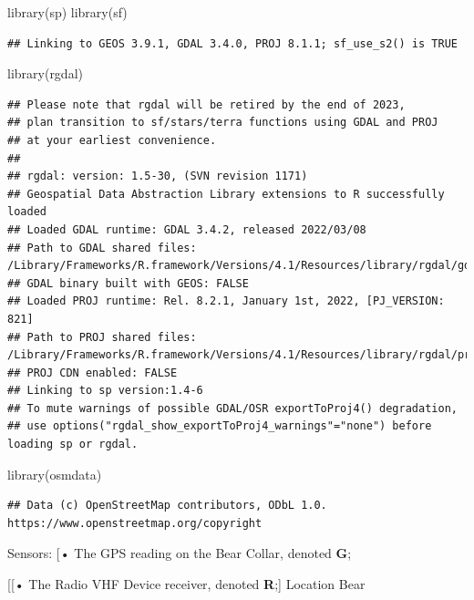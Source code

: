 \documentclass[
]{article}
\newenvironment{Shaded}{\begin{snugshade}}{\end{snugshade}}
\newcommand{\FunctionTok}[1]{\textcolor[rgb]{0.00,0.00,0.00}{#1}}
\newcommand{\NormalTok}[1]{#1}
\begin{document}
\begin{Shaded}
\begin{Highlighting}[]
\FunctionTok{library}\NormalTok{(sp)}
\FunctionTok{library}\NormalTok{(sf)}
\end{Highlighting}
\end{Shaded}

\begin{verbatim}
## Linking to GEOS 3.9.1, GDAL 3.4.0, PROJ 8.1.1; sf_use_s2() is TRUE
\end{verbatim}

\begin{Shaded}
\begin{Highlighting}[]
\FunctionTok{library}\NormalTok{(rgdal)}
\end{Highlighting}
\end{Shaded}

\begin{verbatim}
## Please note that rgdal will be retired by the end of 2023,
## plan transition to sf/stars/terra functions using GDAL and PROJ
## at your earliest convenience.
## 
## rgdal: version: 1.5-30, (SVN revision 1171)
## Geospatial Data Abstraction Library extensions to R successfully loaded
## Loaded GDAL runtime: GDAL 3.4.2, released 2022/03/08
## Path to GDAL shared files: /Library/Frameworks/R.framework/Versions/4.1/Resources/library/rgdal/gdal
## GDAL binary built with GEOS: FALSE 
## Loaded PROJ runtime: Rel. 8.2.1, January 1st, 2022, [PJ_VERSION: 821]
## Path to PROJ shared files: /Library/Frameworks/R.framework/Versions/4.1/Resources/library/rgdal/proj
## PROJ CDN enabled: FALSE
## Linking to sp version:1.4-6
## To mute warnings of possible GDAL/OSR exportToProj4() degradation,
## use options("rgdal_show_exportToProj4_warnings"="none") before loading sp or rgdal.
\end{verbatim}

\begin{Shaded}
\begin{Highlighting}[]
\FunctionTok{library}\NormalTok{(osmdata)}
\end{Highlighting}
\end{Shaded}

\begin{verbatim}
## Data (c) OpenStreetMap contributors, ODbL 1.0. https://www.openstreetmap.org/copyright
\end{verbatim}

Sensors: {[}• The GPS reading on the Bear Collar, denoted \textbf{G};

{[}{[}• The Radio VHF Device receiver, denoted \textbf{R};{]} Location
Bear
\end{document}
